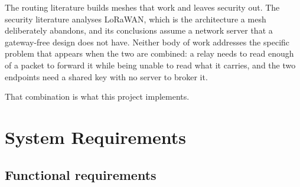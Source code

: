 \documentclass[12pt,a4paper,oneside]{report}
\begin{document}
The routing literature builds meshes that work and leaves security out. The
security literature analyses LoRaWAN, which is the architecture a mesh
deliberately abandons, and its conclusions assume a network server that a
gateway-free design does not have. Neither body of work addresses the specific
problem that appears when the two are combined: a relay needs to read enough of a
packet to forward it while being unable to read what it carries, and the two
endpoints need a shared key with no server to broker it.

That combination is what this project implements.

\chapter{System Requirements}

\section{Functional requirements}
\end{document}

